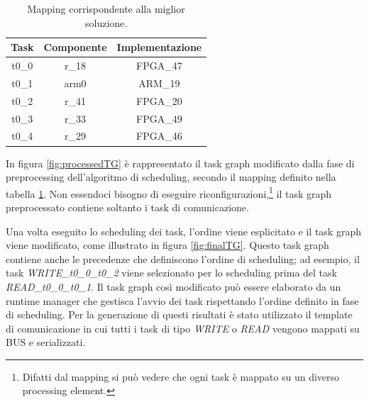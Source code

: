 \begin{table}[tb]
 \begin{center}
  \begin{tabular}{|c|c|c|}
   \hline
   \textbf{Task} & \textbf{Componente} & \textbf{Implementazione}\\
   \hline
   t0\_0 & r\_18 & FPGA\_47\\
   \hline
   t0\_1 & arm0 & ARM\_19\\
   \hline
   t0\_2 & r\_41 & FPGA\_20\\
   \hline
   t0\_3 & r\_33 & FPGA\_49\\
   \hline
   t0\_4 & r\_29 & FPGA\_46\\
   \hline
  \end{tabular}
  \caption{Mapping corrispondente alla miglior soluzione.}
  \label{tab:bestMapping}
 \end{center}
\end{table}

In figura \ref{fig:processedTG} \`e rappresentato il task graph modificato dalla fase
di preprocessing dell'algoritmo di scheduling, secondo il mapping definito nella tabella
\ref{tab:bestMapping}. Non essendoci bisogno di eseguire riconfigurazioni,\footnote{Difatti
dal mapping si pu\`o vedere che ogni task \`e mappato su un diverso processing element.}
il task graph preprocessato contiene soltanto i task di comunicazione.

Una volta eseguito lo scheduling dei task, l'ordine viene esplicitato
e il task graph viene modificato, come illustrato in figura \ref{fig:finalTG}.
Questo task graph contiene anche le precedenze che definiscono l'ordine di scheduling;
ad esempio, il task \emph{WRITE\_t0\_0\_t0\_2} viene selezionato per lo scheduling prima del task
\emph{READ\_t0\_0\_t0\_1}. Il task graph cos\`i modificato pu\`o essere elaborato da un runtime
manager che gestisca l'avvio dei task rispettando l'ordine definito in fase di scheduling.
Per la generazione di questi risultati \`e stato utilizzato il template di comunicazione
in cui tutti i task di tipo \emph{WRITE} o \emph{READ} vengono mappati su BUS e serializzati.


